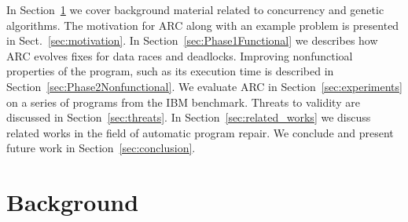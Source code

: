 \documentclass{llncs}
\begin{document}
In Section~\ref{sec:background} we cover background material related to concurrency and genetic algorithms. The motivation for ARC along with an example problem is presented in Sect.~\ref{sec:motivation}. In Section~\ref{sec:Phase1Functional} we describes how ARC evolves fixes for data races and deadlocks. Improving nonfunctioal properties of the program, such as its execution time is described in Section~\ref{sec:Phase2Nonfunctional}. We evaluate ARC in Section~\ref{sec:experiments} on a series of programs from the IBM benchmark. Threats to validity are discussed in Section~\ref{sec:threats}. In Section~\ref{sec:related_works} we discuss related works in the field of automatic program repair.  We conclude and present future work in Section~\ref{sec:conclusion}.

\section{Background}
\label{sec:background}



\end{document}
